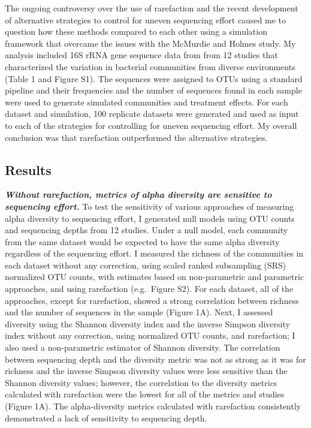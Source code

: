 \documentclass[
]{article}
\begin{document}
The ongoing controversy over the use of rarefaction and the recent
development of alternative strategies to control for uneven sequencing
effort caused me to question how these methods compared to each other
using a simulation framework that overcame the issues with the McMurdie
and Holmes study. My analysis included 16S rRNA gene sequence data from
from 12 studies that characterized the variation in bacterial
communities from diverse environments (Table 1 and Figure S1). The
sequences were assigned to OTUs using a standard pipeline and their
frequencies and the number of sequences found in each sample were used
to generate simulated communities and treatment effects. For each
dataset and simulation, 100 replicate datasets were generated and used
as input to each of the strategies for controlling for uneven sequencing
effort. My overall conclusion was that rarefaction outperformed the
alternative strategies.

\hypertarget{results}{%
\subsection{Results}\label{results}}

\textbf{\emph{Without rarefaction, metrics of alpha diversity are
sensitive to sequencing effort.}} To test the sensitivity of various
approaches of measuring alpha diversity to sequencing effort, I
generated null models using OTU counts and sequencing depths from 12
studies. Under a null model, each community from the same dataset would
be expected to have the same alpha diversity regardless of the
sequencing effort. I measured the richness of the communities in each
dataset without any correction, using scaled ranked subsampling (SRS)
normalized OTU counts, with estimates based on non-parametric and
parametric approaches, and using rarefaction (e.g.~Figure S2). For each
dataset, all of the approaches, except for rarefaction, showed a strong
correlation between richness and the number of sequences in the sample
(Figure 1A). Next, I assessed diversity using the Shannon diversity
index and the inverse Simpson diversity index without any correction,
using normalized OTU counts, and rarefaction; I also used a
non-parametric estimator of Shannon diversity. The correlation between
sequencing depth and the diversity metric was not as strong as it was
for richness and the inverse Simpson diversity values were less
sensitive than the Shannon diversity values; however, the correlation to
the diversity metrics calculated with rarefaction were the lowest for
all of the metrics and studies (Figure 1A). The alpha-diversity metrics
calculated with rarefaction consistently demonstrated a lack of
sensitivity to sequencing depth.
\end{document}
